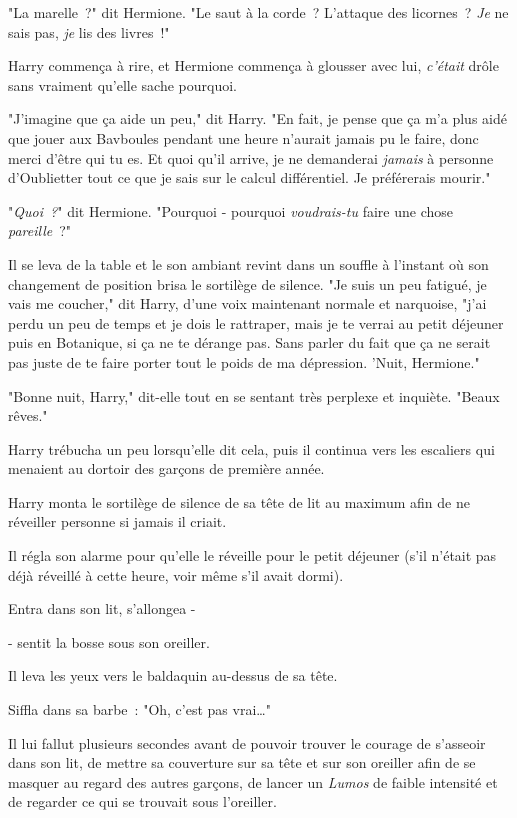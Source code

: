 "La marelle~?" dit Hermione. "Le saut à la corde~? L'attaque des licornes~? \emph{Je} ne sais pas, \emph{je} lis des livres~!"

Harry commença à rire, et Hermione commença à glousser avec lui, \emph{c'était} drôle sans vraiment qu'elle sache pourquoi.

"J'imagine que ça aide un peu," dit Harry. "En fait, je pense que ça m'a plus aidé que jouer aux Bavboules pendant une heure n'aurait jamais pu le faire, donc merci d'être qui tu es. Et quoi qu'il arrive, je ne demanderai \emph{jamais} à personne d'Oublietter tout ce que je sais sur le calcul différentiel. Je préférerais mourir."

"\emph{Quoi~?}" dit Hermione. "Pourquoi - pourquoi \emph{voudrais-tu} faire une chose \emph{pareille}~?"

Il se leva de la table et le son ambiant revint dans un souffle à l'instant où son changement de position brisa le sortilège de silence. "Je suis un peu fatigué, je vais me coucher," dit Harry, d'une voix maintenant normale et narquoise, "j'ai perdu un peu de temps et je dois le rattraper, mais je te verrai au petit déjeuner puis en Botanique, si ça ne te dérange pas. Sans parler du fait que ça ne serait pas juste de te faire porter tout le poids de ma dépression. 'Nuit, Hermione."

"Bonne nuit, Harry," dit-elle tout en se sentant très perplexe et inquiète. "Beaux rêves."

Harry trébucha un peu lorsqu'elle dit cela, puis il continua vers les escaliers qui menaient au dortoir des garçons de première année.

\later

Harry monta le sortilège de silence de sa tête de lit au maximum afin de ne réveiller personne si jamais il criait.

Il régla son alarme pour qu'elle le réveille pour le petit déjeuner (s'il n'était pas déjà réveillé à cette heure, voir même s'il avait dormi).

Entra dans son lit, s'allongea -

- sentit la bosse sous son oreiller.

Il leva les yeux vers le baldaquin au-dessus de sa tête.

Siffla dans sa barbe~: "Oh, c'est pas vrai…"

Il lui fallut plusieurs secondes avant de pouvoir trouver le courage de s'asseoir dans son lit, de mettre sa couverture sur sa tête et sur son oreiller afin de se masquer au regard des autres garçons, de lancer un \emph{Lumos} de faible intensité et de regarder ce qui se trouvait sous l'oreiller.

